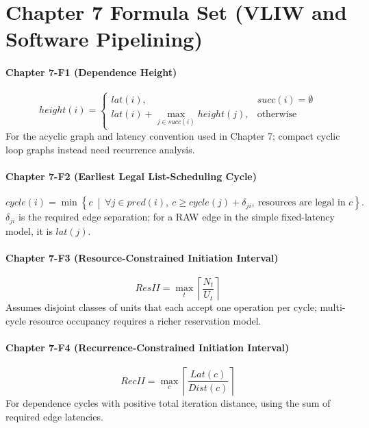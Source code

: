 \section*{Chapter 7 Formula Set (VLIW and Software Pipelining)}\label{sec:ch7-formulas}

\paragraph{Chapter 7-F1 (Dependence Height)}\label{par:ch7-formula-1}
\begin{equation}\label{eq:app-ch7-formula-height}
    height(i)=
    \begin{cases}
        lat(i), & succ(i)=\emptyset\\
        lat(i)+\max\limits_{j\in succ(i)} height(j), & \text{otherwise}
    \end{cases}
\end{equation}
For the acyclic graph and latency convention used in Chapter 7; compact cyclic loop graphs instead need recurrence analysis.

\paragraph{Chapter 7-F2 (Earliest Legal List-Scheduling Cycle)}\label{par:ch7-formula-2}
\begin{equation}\label{eq:app-ch7-formula-list-legal}
    cycle(i)=\min\!\left\{c\ \middle|\ \forall j\in pred(i),\ c\ge cycle(j)+\delta_{ji},\ \text{resources are legal in }c \right\}.
\end{equation}
$\delta_{ji}$ is the required edge separation; for a RAW edge in the simple fixed-latency model, it is $lat(j)$.

\paragraph{Chapter 7-F3 (Resource-Constrained Initiation Interval)}\label{par:ch7-formula-3}
\begin{equation}\label{eq:app-ch7-formula-res-ii}
    ResII=\max_t \left\lceil \frac{N_t}{U_t} \right\rceil
\end{equation}
Assumes disjoint classes of units that each accept one operation per cycle; multi-cycle resource occupancy requires a richer reservation model.

\paragraph{Chapter 7-F4 (Recurrence-Constrained Initiation Interval)}\label{par:ch7-formula-4}
\begin{equation}\label{eq:app-ch7-formula-rec-ii}
    RecII=\max_c \left\lceil \frac{Lat(c)}{Dist(c)} \right\rceil
\end{equation}
For dependence cycles with positive total iteration distance, using the sum of required edge latencies.

